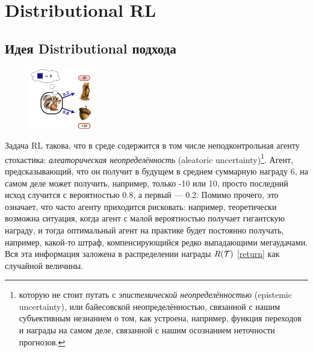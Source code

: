 \section{Distributional RL}

\subsection{Идея Distributional подхода}

\begin{figure}
\vspace{-0.3cm}
\centering
\includegraphics[width=0.25\textwidth]{Images/DistributionalRL1.png}
\vspace{-0.6cm}
\end{figure}
Задача RL такова, что в среде содержится в том числе неподконтрольная агенту стохастика: \emph{алеаторическая неопределённость} (aleatoric uncertainty)\footnote{которую не стоит путать с \emph{эпистемической неопределённостью} (epistemic uncertainty), или байесовской неопределённостью, связанной с нашим субъективным незнанием о том, как устроена, например, функция переходов и награды на самом деле, связанной с нашим осознанием неточности прогнозов.}. Агент, предсказывающий, что он получит в будущем в среднем суммарную награду 6, на самом деле может получить, например, только -10 или 10, просто последний исход случится с вероятностью 0.8, а первый --- 0.2. Помимо прочего, это означает, что часто агенту приходится рисковать: например, теоретически возможна ситуация, когда агент с малой вероятностью получает гигантскую награду, и тогда оптимальный агент на практике будет постоянно получать, например, какой-то штраф, компенсирующийся редко выпадающими мегаудачами. Вся эта информация заложена в распределении награды $R(\mathcal{T})$ \eqref{return} как случайной величины.

